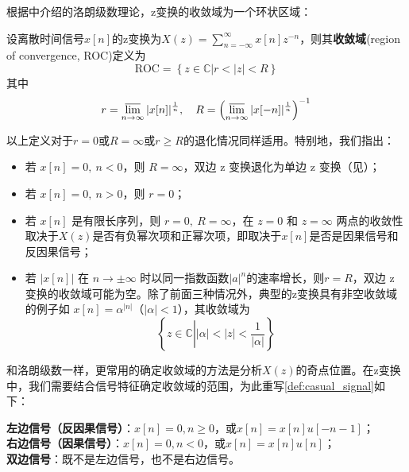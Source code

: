 根据中介绍的洛朗级数理论，z变换的收敛域为一个环状区域：
\begin{definition}[z变换的收敛域]\label{def:ROC}
    设离散时间信号$x[n]$的z变换为$X(z)=\sum_{n=-\infty}^{\infty}x[n]z^{-n}$，则其\textbf{收敛域}(region of convergence, ROC)定义为
    \[\text{ROC}=\left\{z\in\mathbb{C} \left|r<|z|<R\right.\right\}\]
    其中
    \[r=\varlimsup_{n\to\infty}|x[n]|^{\frac{1}{n}},\quad R=\left(\varlimsup_{n\to\infty}|x[-n]|^{\frac{1}{n}}\right)^{-1}\]
\end{definition}
以上定义对于$r=0$或$R=\infty$或$r\geq R$的退化情况同样适用。特别地，我们指出：
\begin{itemize}
    \item 若 \( x[n] = 0,\ n < 0 \)，则 \( R=\infty \)，双边 z 变换退化为单边 z 变换（见）；
    \item 若 \( x[n] = 0,\ n > 0 \)，则 \( r = 0 \)；
    \item 若 \( x[n] \) 是有限长序列，则 \( r = 0,\ R = \infty \)，在 \( z = 0 \) 和 \( z = \infty \) 两点的收敛性取决于$X(z)$是否有负幂次项和正幂次项，即取决于$x[n]$是否是因果信号和反因果信号；
    \item 若 \( |x[n]| \) 在 \( n \to \pm \infty \) 时以同一指数函数$|a|^n$的速率增长，则$r=R$，双边 z 变换的收敛域可能为空。除了前面三种情况外，典型的z变换具有非空收敛域的例子如 \( x[n] = \alpha^{|n|} \)（\( |\alpha| < 1 \)），其收敛域为
     \[\left\{z\in\mathbb{C}\left| |\alpha| < |z| < \dfrac{1}{|\alpha|}\right. \right\}\]
\end{itemize}

和洛朗级数一样，更常用的确定收敛域的方法是分析$X(z)$的奇点位置。在z变换中，我们需要结合信号特征确定收敛域的范围，为此重写\cref{def:casual_signal}如下：
\begin{definition}
    \textbf{左边信号（反因果信号）}：$x[n]=0,n\geq 0$，或$x[n]=x[n]u[-n-1]$；\\
    \textbf{右边信号（因果信号）}：$x[n]=0,n<0$，或$x[n]=x[n]u[n]$；\\
    \textbf{双边信号}：既不是左边信号，也不是右边信号。
\end{definition}

